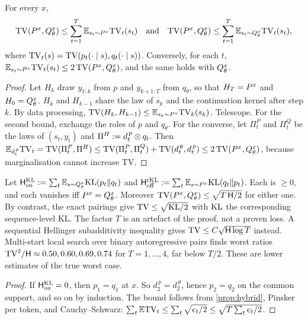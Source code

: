\begin{proposition}\label{prop:hybrid}
\Pv\Ck For every $x$,
\[
\mathrm{TV}(P^{x},Q^{x}_{\theta})\le\sum_{t=1}^T\mathbb{E}_{s_t\sim P^{x}}\mathrm{TV}_t(s_t)
\quad\text{and}\quad
\mathrm{TV}(P^{x},Q^{x}_{\theta})\le\sum_{t=1}^T\mathbb{E}_{s_t\sim Q^{x}_{\theta}}\mathrm{TV}_t(s_t),
\]
where $\mathrm{TV}_t(s)=\mathrm{TV}(p_t(\cdot\mid s),q_t(\cdot\mid s))$. Conversely, for each $t$,
$\mathbb{E}_{s_t\sim P^{x}}\mathrm{TV}_t(s_t)\le2\,\mathrm{TV}(P^{x},Q^{x}_{\theta})$, and the same holds with $Q^{x}_{\theta}$.
\end{proposition}
\begin{proof}
Let $H_k$ draw $y_{1:k}$ from $p$ and $y_{k+1:T}$ from $q_\theta$, so that $H_T=P^{x}$ and $H_0=Q^{x}_{\theta}$.
$H_k$ and $H_{k-1}$ share the law of $s_k$ and the continuation kernel after step $k$. By data processing,
$\mathrm{TV}(H_k,H_{k-1})\le\mathbb{E}_{s_k\sim P^{x}}\mathrm{TV}_k(s_k)$. Telescope. For the second bound, exchange the roles of
$p$ and $q_\theta$.
For the converse, let $\Pi^P_t$ and $\Pi^Q_t$ be the laws of $(s_t,y_t)$ and $\Pi^H:=d^{\,p}_{t}\otimes q_t$. Then
$\mathbb{E}_{d^{\,p}_{t}}\mathrm{TV}_t=\mathrm{TV}(\Pi^P_t,\Pi^H)\le\mathrm{TV}(\Pi^P_t,\Pi^Q_t)+\mathrm{TV}(d^{\,\theta}_{t},d^{\,p}_{t})\le2\,\mathrm{TV}(P^{x},Q^{x}_{\theta})$,
because marginalisation cannot increase TV.
\end{proof}

\begin{proposition}\label{prop:hybrid-div}
\Pv Let $\mathsf H_{\mathrm{on}}^{\mathrm{KL}}:=\sum_t\mathbb{E}_{s\sim Q^{x}_{\theta}}\mathrm{KL}(p_t\|q_t)$ and
$\mathsf H_{\mathrm{off}}^{\mathrm{rKL}}:=\sum_t\mathbb{E}_{s\sim P^{x}}\mathrm{KL}(q_t\|p_t)$. Each is $\ge0$, and each
vanishes iff $P^{x}=Q^{x}_{\theta}$. Moreover $\mathrm{TV}(P^{x},Q^{x}_{\theta})\le\sqrt{T\,\mathsf H/2}$ for either one.
By contrast, the exact pairings give $\mathrm{TV}\le\sqrt{\mathrm{KL}/2}$ with $\mathrm{KL}$ the corresponding sequence-level KL.
The factor $T$ is an artefact of the proof, not a proven loss. A sequential Hellinger subadditivity
inequality \citep{foster2021statistical} gives $\mathrm{TV}\le C\sqrt{\mathsf H\log T}$ instead. Multi-start local search over binary
autoregressive pairs finds worst ratios $\mathrm{TV}^2/\mathsf H\approx0.50,0.60,0.69,0.74$ for $T=1,\dots,4$, far below $T/2$. These are
lower estimates of the true worst case.
\end{proposition}
\begin{proof}
If $\mathsf H_{\mathrm{on}}^{\mathrm{KL}}=0$, then $p_1=q_1$ at $x$. So $d_2^{\,p}=d_2^{\,\theta}$, hence $p_2=q_2$ on the
common support, and so on by induction. The bound follows from \cref{prop:hybrid}, Pinsker per token,
and Cauchy--Schwarz: $\sum_t\mathbb{E}\mathrm{TV}_t\le\sum_t\sqrt{e_t/2}\le\sqrt{T\sum_te_t/2}$.
\end{proof}

